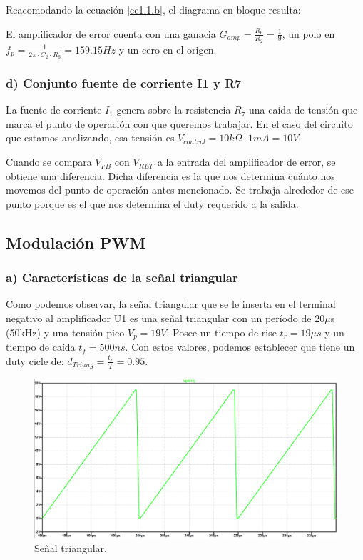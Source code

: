 \documentclass[e4_tp2_main.tex]{subfiles}
\begin{document}
Reacomodando la ecuaci\'on \eqref{ec1.1.b}, el diagrama en bloque resulta: 

\begin{center}
\end{center}


El amplificador de error cuenta con una ganacia $G_{amp}=\frac{R_6}{R_2} =\frac{1}{9}$, un polo en $f_p=\frac{1}{2 \pi \cdot C_2 \cdot R_6 }=159.15Hz$ y un cero en el origen.


\subsubsection*{d) Conjunto fuente de corriente I1 y R7}
La fuente de corriente $I_1$ genera sobre la resistencia $R_7$ una ca\'ida de tensi\'on que marca el punto de operaci\'on con que queremos trabajar. En el caso del circuito que estamos analizando, esa tensi\'on es $V_{control}=10k\Omega \cdot 1mA =10V$. 

Cuando se compara $V_{FB}$ con $V_{REF}$ a la entrada del amplificador de error, se obtiene una diferencia. Dicha diferencia es la que nos determina cu\'anto nos movemos del punto de operaci\'on antes mencionado. Se trabaja alrededor de ese punto porque es el que nos determina el duty requerido a la salida.

\subsection{Modulaci\'on PWM}


\subsubsection*{a) Caracter\'isticas de la se\~nal triangular}
Como podemos observar, la señal triangular que se le inserta en el terminal negativo al amplificador U1 es una señal triangular con un período de 20$\mu $s (50kHz) y una tensión pico $V_p=19 V$. Posee un tiempo de rise $t_r=19 \mu s$ y un tiempo de caída $t_f=500ns$. Con estos valores, podemos establecer que tiene un duty cicle de: $d_{Triang}= \frac{t_r}{T}=0.95$. 
\begin{figure}[H]
\centering
\includegraphics[width=0.4\linewidth]{Imagenes/Punto1/triang_shape.png}
\caption{Señal triangular.}
\end{figure}
\end{document}
